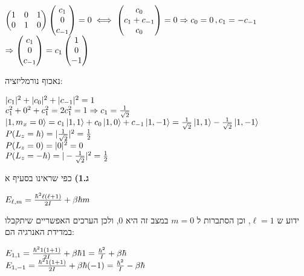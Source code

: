 \documentclass[14pt]{extarticle}
\makeatletter
\newenvironment{lefteqs}{%
    \begin{english}%
    \begin{flushleft}%
    \renewcommand{\arraystretch}{1.3}%
    $\begin{array}{@{}l@{}}%
}{%
    \end{array}$%
    \end{flushleft}%
    \end{english}%
}
\makeatother
\begin{document}
\begin{lefteqs}
\begin{pmatrix}
        1 & 0 & 1 \\
        0 & 1 & 0
    \end{pmatrix} \begin{pmatrix}
        c_1 \\
        0 \\
        c_{-1}
    \end{pmatrix} = 0 \iff \begin{pmatrix}
        c_0 \\
        c_1 + c_{-1} \\
        c_0
    \end{pmatrix} = 0 \Rightarrow c_0 = 0 \, , c_1 = -c_{-1} \\
    \Rightarrow \begin{pmatrix}
        c_1 \\
        0 \\
        c_{-1}
    \end{pmatrix} = c_1 \begin{pmatrix}
        1 \\
        0 \\
        -1
    \end{pmatrix}
\end{lefteqs}

נאכוף נורמליזציה:

\begin{lefteqs}
    |c_1|^2 + |c_0|^2 + |c_{-1}|^2 = 1 \\
    c_1^2 + 0^2 + c_1^2 = 2c_1^2 = 1 \Rightarrow c_1 = \frac{1}{\sqrt{2}} \\
    \ket{1, m_x=0} = c_1 \ket{1,1} + c_0 \ket{1,0} + c_{-1} \ket{1,-1} = \frac{1}{\sqrt{2}} \ket{1,1} -\frac{1}{\sqrt{2}}\ket{1,-1} \\
    P(L_z = \hbar) = |\frac{1}{\sqrt{2}}|^2 = \frac{1}{2} \\
    P(L_z = 0) = |0|^2 = 0 \\
    P(L_z = -\hbar) = |-\frac{1}{\sqrt{2}}|^2 = \frac{1}{2}
\end{lefteqs}


\textbf{ג.1)}
כפי שראינו בסעיף א
\begin{lefteqs}
    E_{\ell, m} = \frac{\hbar^2 \ell (\ell + 1)}{2I} + \beta \hbar m
\end{lefteqs}

ידוע ש $\ell = 1$, וכן הסתברות ל $m=0$ במצב זה היא 0, ולכן הערכים האפשריים שיתקבלו במדידת האנרגיה הם:

\begin{lefteqs}
    E_{1,1} = \frac{\hbar^2 1(1+1)}{2I} + \beta \hbar 1 = \frac{\hbar^2}{I} + \beta \hbar \\
    E_{1,-1} = \frac{\hbar^2 1(1+1)}{2I} + \beta \hbar (-1) = \frac{\hbar^2}{I} - \beta \hbar
\end{lefteqs}
\end{document}
